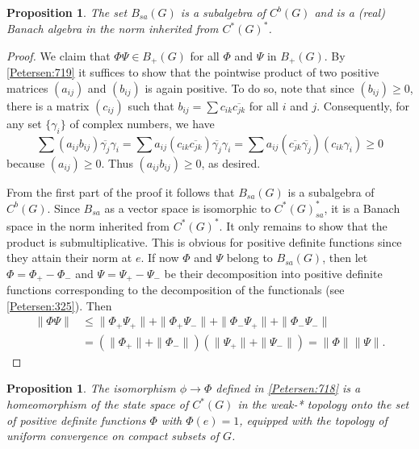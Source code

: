 \documentclass{book}
\newtheorem{proposition}[definition]{Proposition}
\begin{document}
\begin{proposition}\label{Petersen:7110}
  The set \(B_{sa}(G)\) is a subalgebra of \(C^b(G)\) and is a (real) Banach algebra in the norm inherited from \(C^*(G)^*\).
\end{proposition}
\begin{proof}
  We claim that \(\Phi\Psi \in B_+(G)\) for all \(\Phi\) and \(\Psi\) in \(B_+(G)\). By \ref{Petersen:719} it
  suffices to show that the pointwise product of two positive matrices \((a_{ij})\) and
  \((b_{ij} )\) is again positive. To do so, note that since \((b_{ij}) \geq 0\), there is a matrix
  \((c_{ij} )\) such that \(b_{ij} = \sum c_{ik}\overline{c_{jk}}\) for all \(i\) and \(j\). Consequently, for any set \(\{\gamma_{i}\}\) of
  complex numbers, we have
  \[
    \sum(a_{ij}b_{ij})\overline{\gamma_{j}}\gamma_i=\sum a_{ij}(c_{ik}\overline{c_{jk}})\overline{\gamma_{j}}\gamma_i=\sum a_{ij}(\overline{c_{jk}}\overline{\gamma_{j}})(c_{ik}\gamma_i)\geq 0
  \]
  because \((a_{ij})\geq 0\). Thus \((a_{ij}b_{ij})\geq 0\), as desired.\par
  From the first part of the proof it follows that \(B_{sa}(G)\) is a subalgebra of \(C^b(G)\).
  Since \(B_{sa}\) as a vector space is isomorphic to \(C^*(G)^*_{sa}\), it is a Banach space 
  in the norm inherited from \(C^*(G)^*\). It only remains to show that the product is submultiplicative.
  This is obvious for positive definite functions since they attain their norm at \(e\).
  If now \(\Phi\) and \(\Psi\) belong to \(B_{sa}(G)\), then let \(\Phi=\Phi_+-\Phi_-\)
  and \(\Psi = \Psi_+-\Psi_-\) be their decomposition into positive definite functions 
  corresponding to the decomposition of the functionals (see \ref{Petersen:325}). Then
  \begin{align*}
    \|\Phi\Psi\|&\leq \|\Phi_+\Psi_+\|+\|\Phi_+\Psi_-\|+\|\Phi_-\Psi_+\|+\|\Phi_-\Psi_-\|\\
    &=(\|\Phi_+\|+\|\Phi_-\|)(\|\Psi_+\|+\|\Psi_-\|)=\|\Phi\|\|\Psi\|.
  \end{align*}
\end{proof}
\begin{proposition}\label{Petersen:7111}
  The isomorphism \(\phi\rightarrow\Phi\) defined in \ref{Petersen:718} is a homeomorphism of the 
  state space of \(C^*(G)\) in the weak-* topology onto the set of positive definite functions \(\Phi\) 
  with \(\Phi(e)=1\), equipped with the topology of uniform convergence on 
  compact subsets of \(G\).
\end{proposition}
\end{document}

